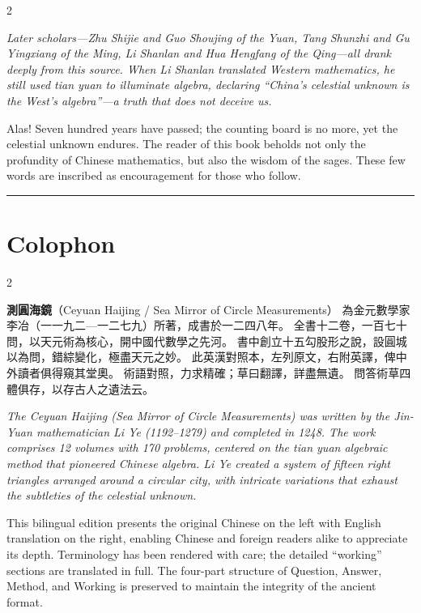 \documentclass[11pt,a4paper]{article}
\newcommand{\longline}{\noindent\rule{\textwidth}{0.4pt}}
\newcommand{\cnpar}[1]{{\tradfont #1\par}}
\newcommand{\enpar}[1]{{\itshape #1\par}}
\begin{document}
\begin{paracol}{2}
\switchcolumn

\enpar{%
Later scholars---Zhu Shijie and Guo Shoujing of the Yuan, Tang Shunzhi and Gu Yingxiang of the Ming, Li Shanlan and Hua Hengfang of the Qing---all drank deeply from this source. When Li Shanlan translated Western mathematics, he still used \textit{tian yuan} to illuminate algebra, declaring ``China's celestial unknown is the West's algebra''---a truth that does not deceive us.

Alas! Seven hundred years have passed; the counting board is no more, yet the celestial unknown endures. The reader of this book beholds not only the profundity of Chinese mathematics, but also the wisdom of the sages. These few words are inscribed as encouragement for those who follow.}

\end{paracol}

\vspace{1cm}
\begin{center}
\longline
\end{center}

\newpage

\section*{Colophon}

\begin{paracol}{2}
\cnpar{%
\textbf{測圓海鏡}（Ceyuan Haijing / Sea Mirror of Circle Measurements）
為金元數學家李冶（一一九二---一二七九）所著，成書於一二四八年。
全書十二卷，一百七十問，以天元術為核心，開中國代數學之先河。
書中創立十五勾股形之說，設圓城以為問，錯綜變化，極盡天元之妙。
此英漢對照本，左列原文，右附英譯，俾中外讀者俱得窺其堂奧。
術語對照，力求精確；草曰翻譯，詳盡無遺。
問答術草四體俱存，以存古人之遺法云。}

\switchcolumn

\enpar{%
The \textit{Ceyuan Haijing} (Sea Mirror of Circle Measurements) was written by the Jin-Yuan mathematician Li Ye (1192--1279) and completed in 1248. The work comprises 12 volumes with 170 problems, centered on the \textit{tian yuan} algebraic method that pioneered Chinese algebra. Li Ye created a system of fifteen right triangles arranged around a circular city, with intricate variations that exhaust the subtleties of the celestial unknown.

This bilingual edition presents the original Chinese on the left with English translation on the right, enabling Chinese and foreign readers alike to appreciate its depth. Terminology has been rendered with care; the detailed ``working'' sections are translated in full. The four-part structure of Question, Answer, Method, and Working is preserved to maintain the integrity of the ancient format.}

\end{paracol}
\end{document}
